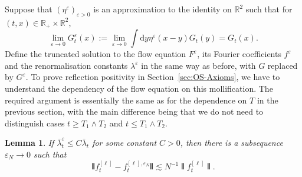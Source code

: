 \documentclass[11pt, a4paper]{scrartcl}
\numberwithin{equation}{section}
\theoremstyle{plain}
\newtheorem{lemma}[foo]{Lemma}
\theoremstyle{remark}
\newcommand{\assign}{:=}
\newcommand{\mathd}{\mathrm{d}}
\begin{document}
   Suppose that $(\eta^{\varepsilon})_{\varepsilon > 0}$ is an approximation to
   the identity on $\mathbb{R}^2$ such that for $(t, x) \in \mathbb{R}_+ \times
   \mathbb{R}^2$,
   \[ \lim_{\varepsilon \rightarrow 0} G^{\varepsilon}_t (x) \assign
      \lim_{\varepsilon \rightarrow 0}  \int \mathd y \eta^{\varepsilon} (x - y) 
      G_t (y) = G_t (x) . \]
   Define the truncated solution to the flow equation $F^{\varepsilon}$, its
   Fourier coefficients $f^{\varepsilon}$ and the renormalisation constants
   $\lambda^{\varepsilon}$ in the same way as before, with $G$ replaced by
   $G^{\varepsilon}$. To prove reflection positivity in
   Section~\ref{sec:OS-Axioms}, we have to understand the dependency of the flow
   equation on this mollification.
   The required argument is essentially the same as for the dependence on $T$ in 
   the previous section, with the main difference being that we do not need to
   distinguish cases $t\geq T_1\wedge T_2$ and $t\leq T_1\wedge T_2$.
   
   \begin{lemma}
     \label{lem:f-eps-convergence}If $\bar{\lambda}_t^{\varepsilon} \leqslant C
     \bar{\lambda}_t$ for some constant $C > 0$, then there is a subsequence
     $\varepsilon_N \rightarrow 0$ such that
     \[ \interleave f^{[\ell]}_t - f_t^{[\ell], \varepsilon_N} \interleave
        \lesssim N^{- 1} \interleave f_t^{[\ell]} \interleave . \]
   \end{lemma}
   
\end{document}
